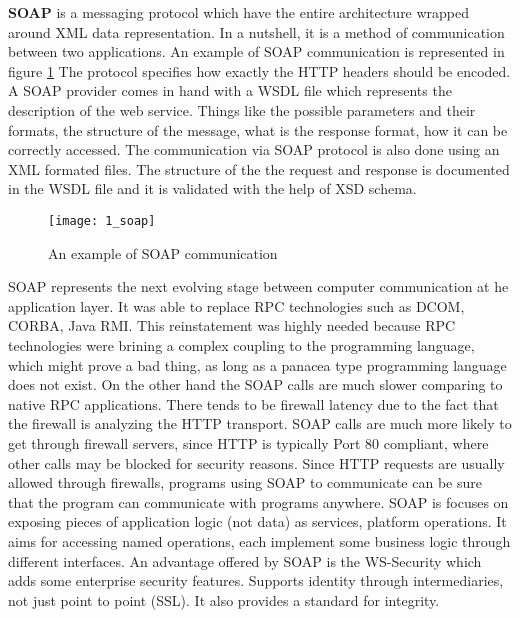 \textbf{SOAP} is a messaging protocol which have the entire architecture wrapped around XML data representation. In a nutshell, it is a method of communication between two applications. An example of SOAP communication is represented in figure \ref{soap} The protocol specifies how exactly the HTTP headers should be encoded. A SOAP provider comes in hand with a WSDL file which represents the description of the web service. Things like the possible parameters and their formats, the structure of the message, what is the response format, how it can be correctly accessed. The communication via SOAP protocol is also done using an XML formated files. The structure of the the request and response is documented in the WSDL file and it is validated with the help of XSD schema.

\begin{figure}[!ht]
\centering
\texttt{[image: 1\_soap]}
\caption{An example of SOAP communication}\label{soap}
\end{figure}


SOAP represents the next evolving stage between computer communication at he application layer. It was able to replace RPC technologies such as DCOM, CORBA, Java RMI. This reinstatement was highly needed because RPC technologies were brining a complex coupling to the programming language, which might prove a bad thing, as long as a panacea type programming language does not exist. On the other hand the SOAP calls are much slower comparing to native RPC applications. There tends to be firewall latency due to the fact that the firewall is analyzing the HTTP transport. SOAP calls are much more likely to get through firewall servers, since HTTP is typically Port 80 compliant, where other calls may be blocked for security reasons. Since HTTP requests are usually allowed through firewalls, programs using SOAP to communicate can be sure that the program can communicate with programs anywhere. SOAP is focuses on exposing pieces of application logic (not data) as services, platform operations. It aims for accessing named operations, each implement some business logic through different interfaces. An advantage offered by SOAP is the WS-Security which adds some enterprise security features. Supports identity through intermediaries, not just point to point (SSL). It also provides a standard for integrity.

